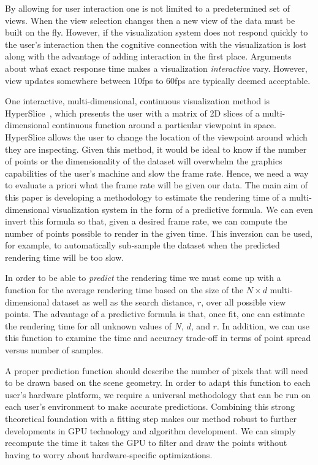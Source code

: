 By allowing for user interaction one is not limited to a
predetermined set of views.  
When the view selection changes then a new view of the data must be built
on the fly.
However, if the visualization system does not respond quickly to 
the user's interaction then the cognitive connection with the visualization
is lost~\cite{Shneiderman:1987} along with the advantage of adding 
interaction in the first place.
Arguments about what exact
response time makes a visualization \emph{interactive} vary.  However,
view updates somewhere between 10fps to 60fps are typically deemed acceptable.

One interactive, multi-dimensional, continuous
visualization method
is HyperSlice~\cite{Wijk:1993}, which presents the user
with a matrix of 2D slices of a multi-dimensional continuous function
around a particular viewpoint in space.
HyperSlice allows the user to change the
location of the viewpoint around which they are inspecting.
Given this method, it would be ideal to know if the number of
points or the dimensionality of the dataset will overwhelm the
graphics capabilities of the user's machine and slow the frame rate. 
Hence, we need a way to evaluate a priori what the frame rate will be
given our data. The main aim of this paper is developing a methodology to 
estimate the rendering time of a multi-dimensional
visualization system in the form of a predictive formula.
We can even invert this formula so that, given a desired frame rate, 
we can compute the number of points 
possible to render in the given time.
This inversion can be used, for example, 
to automatically sub-sample the dataset when the predicted rendering 
time will be too slow.  

In order to be able to \emph{predict} the rendering time we must come up with a
function for the average rendering time based on the size of the $N \times d$
multi-dimensional dataset as well as the search distance, $r$, over all possible view
points.  The advantage
of a predictive formula is that, once fit, one can estimate the rendering time
for all unknown values of $N$, $d$, and $r$.
In addition, we can use this function to examine the time and accuracy
trade-off in terms of point spread versus number of samples.

A proper prediction function should describe the number
of pixels that will need to be drawn based on the scene geometry.
In order to adapt this function
to each user's
hardware platform, we require a universal methodology that can be run on
each user's environment to make accurate predictions.
Combining this strong theoretical foundation with a fitting step makes our
method robust to further developments in GPU technology and algorithm 
development. We can simply recompute the time it takes the GPU to filter and
draw the points without having to worry about hardware-specific optimizations.

